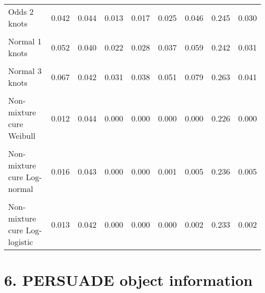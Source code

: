 \documentclass[
]{article}
\begin{document}
\begin{table}[H]
{\begin{tabular}[t]{lrrrrrrrr}
Odds 2 knots & 0.042 & 0.044 & 0.013 & 0.017 & 0.025 & 0.046 & 0.245 & 0.030\\
\cellcolor{gray!10}{Odds 3 knots} & \cellcolor{gray!10}{0.048} & \cellcolor{gray!10}{0.046} & \cellcolor{gray!10}{0.015} & \cellcolor{gray!10}{0.020} & \cellcolor{gray!10}{0.029} & \cellcolor{gray!10}{0.055} & \cellcolor{gray!10}{0.262} & \cellcolor{gray!10}{0.035}\\
Normal 1 knots & 0.052 & 0.040 & 0.022 & 0.028 & 0.037 & 0.059 & 0.242 & 0.031\\
\cellcolor{gray!10}{Normal 2 knots} & \cellcolor{gray!10}{0.053} & \cellcolor{gray!10}{0.040} & \cellcolor{gray!10}{0.023} & \cellcolor{gray!10}{0.028} & \cellcolor{gray!10}{0.038} & \cellcolor{gray!10}{0.060} & \cellcolor{gray!10}{0.241} & \cellcolor{gray!10}{0.032}\\
Normal 3 knots & 0.067 & 0.042 & 0.031 & 0.038 & 0.051 & 0.079 & 0.263 & 0.041\\
\cellcolor{gray!10}{Mixture cure Weibull} & \cellcolor{gray!10}{0.012} & \cellcolor{gray!10}{0.043} & \cellcolor{gray!10}{0.000} & \cellcolor{gray!10}{0.000} & \cellcolor{gray!10}{0.000} & \cellcolor{gray!10}{0.000} & \cellcolor{gray!10}{0.222} & \cellcolor{gray!10}{0.000}\\
Non-mixture cure Weibull & 0.012 & 0.044 & 0.000 & 0.000 & 0.000 & 0.000 & 0.226 & 0.000\\
\cellcolor{gray!10}{Mixture cure Log-normal} & \cellcolor{gray!10}{0.016} & \cellcolor{gray!10}{0.044} & \cellcolor{gray!10}{0.000} & \cellcolor{gray!10}{0.000} & \cellcolor{gray!10}{0.000} & \cellcolor{gray!10}{0.003} & \cellcolor{gray!10}{0.230} & \cellcolor{gray!10}{0.003}\\
Non-mixture cure Log-normal & 0.016 & 0.043 & 0.000 & 0.000 & 0.001 & 0.005 & 0.236 & 0.005\\
\cellcolor{gray!10}{Mixture cure Log-logistic} & \cellcolor{gray!10}{0.014} & \cellcolor{gray!10}{0.043} & \cellcolor{gray!10}{0.000} & \cellcolor{gray!10}{0.000} & \cellcolor{gray!10}{0.000} & \cellcolor{gray!10}{0.003} & \cellcolor{gray!10}{0.234} & \cellcolor{gray!10}{0.002}\\
Non-mixture cure Log-logistic & 0.013 & 0.042 & 0.000 & 0.000 & 0.000 & 0.002 & 0.233 & 0.002\\
\bottomrule
\end{tabular}}
\end{table}

\clearpage

\section{6. PERSUADE object
information}\label{persuade-object-information}
\end{document}
